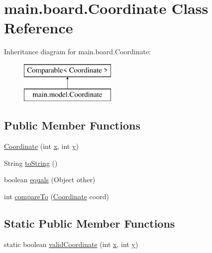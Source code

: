 \hypertarget{classmain_1_1board_1_1_coordinate}{}\section{main.\+board.\+Coordinate Class Reference}
\label{classmain_1_1board_1_1_coordinate}
Inheritance diagram for main.\+board.\+Coordinate\+:\begin{figure}[H]
\begin{center}
\leavevmode
\includegraphics[height=2.000000cm]{classmain_1_1board_1_1_coordinate}
\end{center}
\end{figure}
\subsection*{Public Member Functions}
\begin{DoxyCompactItemize}
\item 
\hyperlink{classmain_1_1board_1_1_coordinate_a355e7b83bfbbfa7b63643484f37042d2}{Coordinate} (int \hyperlink{classmain_1_1board_1_1_coordinate_ac701cbd77073d0d4a9150c818e48786c}{x}, int \hyperlink{classmain_1_1board_1_1_coordinate_a27d26b13fe0a54b6800a9a3e130b0445}{y})
\item 
String \hyperlink{classmain_1_1board_1_1_coordinate_a8eb57ae3629081edbef2d9acf42b3fbb}{to\+String} ()
\item 
boolean \hyperlink{classmain_1_1board_1_1_coordinate_aa81f54d6a109669ec5420494d71c0687}{equals} (Object other)
\item 
int \hyperlink{classmain_1_1board_1_1_coordinate_a376cac714ac3dd5f6452c6678e12ad26}{compare\+To} (\hyperlink{classmain_1_1board_1_1_coordinate}{Coordinate} coord)
\end{DoxyCompactItemize}
\subsection*{Static Public Member Functions}
\begin{DoxyCompactItemize}
\item 
static boolean \hyperlink{classmain_1_1board_1_1_coordinate_afb35e6a6c03ad1680d058a1d1076c9e6}{valid\+Coordinate} (int \hyperlink{classmain_1_1board_1_1_coordinate_ac701cbd77073d0d4a9150c818e48786c}{x}, int \hyperlink{classmain_1_1board_1_1_coordinate_a27d26b13fe0a54b6800a9a3e130b0445}{y})
\end{DoxyCompactItemize}
